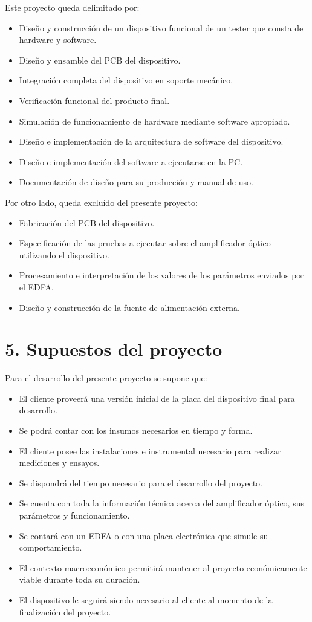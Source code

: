 \documentclass[
11pt, %
codirector, %
]{charter}
\begin{document}
Este proyecto queda delimitado por:
\begin{itemize}
	\item Diseño y construcción de un dispositivo funcional de un tester que consta de hardware y software.
	\item Diseño y ensamble del PCB del dispositivo.
	\item Integración completa del dispositivo en soporte mecánico.
	\item Verificación funcional del producto final.
	\item Simulación de funcionamiento de hardware mediante software apropiado.
	\item Diseño e implementación de la arquitectura de software del dispositivo.
	\item Diseño e implementación del software a ejecutarse en la PC.
	\item Documentación de diseño para su producción y manual de uso.
\end{itemize}

Por otro lado, queda excluído del presente proyecto:
\begin{itemize}
	\item Fabricación del PCB del dispositivo.
	\item Especificación de las pruebas a ejecutar sobre el amplificador óptico utilizando el dispositivo.
	\item Procesamiento e interpretación de los valores de los parámetros enviados por el EDFA.
	\item Diseño y construcción de la fuente de alimentación externa.
\end{itemize}


\section{5. Supuestos del proyecto}
\label{sec:supuestos}

Para el desarrollo del presente proyecto se supone que:
\begin{itemize}
	\item El cliente proveerá una versión inicial de la placa del dispositivo final para desarrollo.
	\item Se podrá contar con los insumos necesarios en tiempo y forma.
	\item El cliente posee las instalaciones e instrumental necesario para realizar mediciones y ensayos.
	\item Se dispondrá del tiempo necesario para el desarrollo del proyecto.
	\item Se cuenta con toda la información técnica acerca del amplificador óptico, sus parámetros y funcionamiento.
	\item Se contará con un EDFA o con una placa electrónica que simule su comportamiento.
	\item El contexto macroeconómico permitirá mantener al proyecto económicamente viable durante toda su duración.
	\item El dispositivo le seguirá siendo necesario al cliente al momento de la finalización del proyecto.
\end{itemize}
\end{document}

